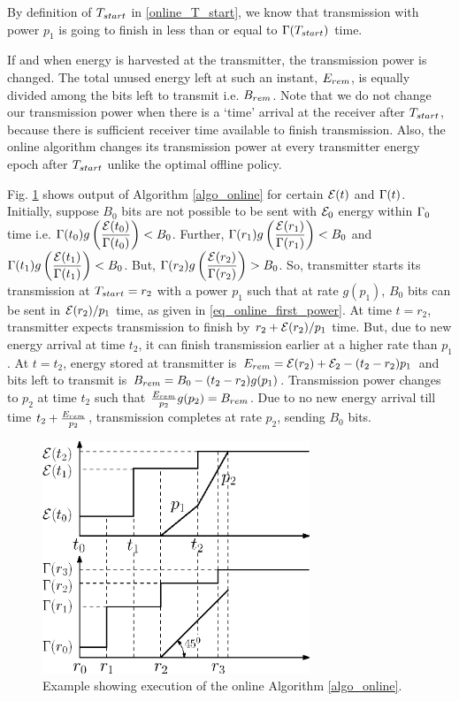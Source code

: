 By definition of $T_{\mbox{\scriptsize{start}}}$ in \eqref{online_T_start}, we know that transmission with power $p_1$ is going to finish in less than or equal to  $\TRx(T_{\mbox{\scriptsize{start}}})$ time.

If and when energy is harvested at the transmitter, the transmission power is changed. The total unused energy left at such an instant, $E_{\mbox{\scriptsize{rem}}}$, is equally divided among the bits left to transmit i.e. $B_{\mbox{\scriptsize{rem}}}$. Note that we do not change our transmission power when there is a `time' arrival at the receiver after $T_{\mbox{\scriptsize{start}}}$, because there is sufficient receiver time available to finish transmission. Also, the online algorithm changes its transmission power at every transmitter energy epoch after $T_{\mbox{\scriptsize{start}}}$ unlike the optimal offline policy. 

Fig. \ref{figure_online_example} shows output of Algorithm \ref{algo_online} for certain $\mathcal{E}(t)$ and $\Gamma(t)$. Initially, suppose $B_0$ bits are not possible to be sent with $\mathcal{E}_0$ energy  within $\Gamma_0$ time i.e. $\Gamma(t_0)g\left( \dfrac{\mathcal{E}(t_0)}{\Gamma(t_0)}\right)<B_0$. Further, $\Gamma(r_1)g\left( \dfrac{\mathcal{E}(r_1)}{\Gamma(r_1)}\right)<B_0$ and $\Gamma(t_1)g\left( \dfrac{\mathcal{E}(t_1)}{\Gamma(t_1)}\right)<B_0$. But, $\Gamma(r_2)g\left( \dfrac{\mathcal{E}(r_2)}{\Gamma(r_2)}\right)>B_0$. So, transmitter starts its transmission at $T_{\mbox{\scriptsize{start}}}=r_2$ with a power $p_1$ such that at rate $g(p_1)$, $B_0$ bits can be sent in $\mathcal{E}(r_2)/p_1$ time, as given in \eqref{eq_online_first_power}. At time $t=r_2$, transmitter expects transmission to finish by $r_2+\mathcal{E}(r_2)/p_1$ time. But, due to new energy arrival at time $t_2$, it can finish transmission earlier at a higher rate than $p_1$. At $t=t_2$, energy stored at transmitter is $E_{\mbox{\scriptsize{rem}}}=\ETx(r_2)+\ETx_2-(t_2-r_2)p_1$ and bits left to transmit is $B_{\mbox{\scriptsize{rem}}}=B_0-(t_2-r_2)g(p_1)$. Transmission power changes to $p_2$ at time $t_2$ such that $\frac{E_{\mbox{\scriptsize{rem}}}}{p_2}g(p_2)=B_{\mbox{\scriptsize{rem}}}$. Due to no new energy arrival till time $t_2+\frac{E_{\mbox{\scriptsize{rem}}}}{p_2}$, transmission completes at rate $p_2$, sending $B_0$ bits. 

\begin{figure}
\centering
  \centerline{\includegraphics[width=8cm]{online.eps}}
\caption{Example showing execution of the online Algorithm \ref{algo_online}.}\label{figure_online_example}
\end{figure}


